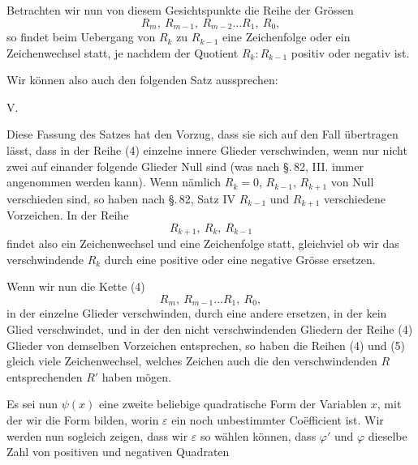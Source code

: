 
Betrachten wir nun von diesem Gesichtspunkte die Reihe der Grössen
\[
R_m,\ R_{m-1},\ R_{m-2} \ldots R_1,\ R_0,
\]
so findet beim Uebergang von $R_k$ zu $R_{k-1}$ eine Zeichenfolge oder ein Zeichenwechsel statt, je nachdem der Quotient $R_k : R_{k-1}$ positiv oder negativ ist.

Wir können also auch den folgenden Satz aussprechen:

V.\ 

Diese Fassung des Satzes hat den Vorzug, dass sie sich auf den Fall übertragen lässt, dass in der Reihe (4) einzelne innere Glieder verschwinden, wenn nur nicht zwei auf einander folgende Glieder Null sind (was nach \S.\,82, III. immer angenommen werden kann). Wenn nämlich $R_k = 0$, $R_{k-1}$, $R_{k+1}$ von Null verschieden sind, so haben nach \S.\,82, Satz IV $R_{k-1}$ und $R_{k+1}$ verschiedene Vorzeichen. In der Reihe
\[
R_{k+1},\ R_k,\ R_{k-1}
\]
findet also ein Zeichenwechsel und eine Zeichenfolge statt, gleichviel ob wir das verschwindende $R_k$ durch eine positive oder eine negative Grösse ersetzen.

Wenn wir nun die Kette (4)
\[
R_m,\ R_{m-1} \ldots R_1,\ R_0,
\]
in der einzelne Glieder verschwinden, durch eine andere ersetzen,
in der kein Glied verschwindet, und in der den nicht verschwindenden Gliedern der Reihe (4) Glieder von demselben Vorzeichen entsprechen, so haben die Reihen (4) und (5) gleich viele Zeichenwechsel, welches Zeichen auch die den verschwindenden $R$ entsprechenden $R'$ haben mögen.

Es sei nun $\psi(x)$ eine zweite beliebige quadratische Form der Variablen $x$, mit der wir die Form
bilden, worin $\varepsilon$ ein noch unbestimmter Co\"efficient ist. Wir werden nun sogleich zeigen, dass wir $\varepsilon$ so wählen können, dass $\varphi'$ und $\varphi$ dieselbe Zahl von positiven und negativen Quadraten

